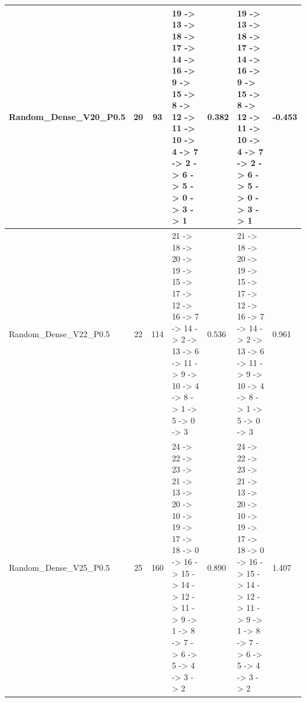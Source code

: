 \documentclass[8pt]{article}
\begin{document}
\begin{longtable}{@{}L{3.2cm} c c L{4cm} L{1.2cm} L{4cm} L{1.2cm}@{}}
\midrule
Random\_Dense\_V20\_P0.5 & 20 & 93 & 19 -\textgreater{} 13 -\textgreater{} 18 -\textgreater{} 17 -\textgreater{} 14 -\textgreater{} 16 -\textgreater{} 9 -\textgreater{} 15 -\textgreater{} 8 -\textgreater{} 12 -\textgreater{} 11 -\textgreater{} 10 -\textgreater{} 4 -\textgreater{} 7 -\textgreater{} 2 -\textgreater{} 6 -\textgreater{} 5 -\textgreater{} 0 -\textgreater{} 3 -\textgreater{} 1 & 0.382 & 19 -\textgreater{} 13 -\textgreater{} 18 -\textgreater{} 17 -\textgreater{} 14 -\textgreater{} 16 -\textgreater{} 9 -\textgreater{} 15 -\textgreater{} 8 -\textgreater{} 12 -\textgreater{} 11 -\textgreater{} 10 -\textgreater{} 4 -\textgreater{} 7 -\textgreater{} 2 -\textgreater{} 6 -\textgreater{} 5 -\textgreater{} 0 -\textgreater{} 3 -\textgreater{} 1 & -0.453 \\
\midrule
Random\_Dense\_V22\_P0.5 & 22 & 114 & 21 -\textgreater{} 18 -\textgreater{} 20 -\textgreater{} 19 -\textgreater{} 15 -\textgreater{} 17 -\textgreater{} 12 -\textgreater{} 16 -\textgreater{} 7 -\textgreater{} 14 -\textgreater{} 2 -\textgreater{} 13 -\textgreater{} 6 -\textgreater{} 11 -\textgreater{} 9 -\textgreater{} 10 -\textgreater{} 4 -\textgreater{} 8 -\textgreater{} 1 -\textgreater{} 5 -\textgreater{} 0 -\textgreater{} 3 & 0.536 & 21 -\textgreater{} 18 -\textgreater{} 20 -\textgreater{} 19 -\textgreater{} 15 -\textgreater{} 17 -\textgreater{} 12 -\textgreater{} 16 -\textgreater{} 7 -\textgreater{} 14 -\textgreater{} 2 -\textgreater{} 13 -\textgreater{} 6 -\textgreater{} 11 -\textgreater{} 9 -\textgreater{} 10 -\textgreater{} 4 -\textgreater{} 8 -\textgreater{} 1 -\textgreater{} 5 -\textgreater{} 0 -\textgreater{} 3 & 0.961 \\
\midrule
Random\_Dense\_V25\_P0.5 & 25 & 160 & 24 -\textgreater{} 22 -\textgreater{} 23 -\textgreater{} 21 -\textgreater{} 13 -\textgreater{} 20 -\textgreater{} 10 -\textgreater{} 19 -\textgreater{} 17 -\textgreater{} 18 -\textgreater{} 0 -\textgreater{} 16 -\textgreater{} 15 -\textgreater{} 14 -\textgreater{} 12 -\textgreater{} 11 -\textgreater{} 9 -\textgreater{} 1 -\textgreater{} 8 -\textgreater{} 7 -\textgreater{} 6 -\textgreater{} 5 -\textgreater{} 4 -\textgreater{} 3 -\textgreater{} 2 & 0.890 & 24 -\textgreater{} 22 -\textgreater{} 23 -\textgreater{} 21 -\textgreater{} 13 -\textgreater{} 20 -\textgreater{} 10 -\textgreater{} 19 -\textgreater{} 17 -\textgreater{} 18 -\textgreater{} 0 -\textgreater{} 16 -\textgreater{} 15 -\textgreater{} 14 -\textgreater{} 12 -\textgreater{} 11 -\textgreater{} 9 -\textgreater{} 1 -\textgreater{} 8 -\textgreater{} 7 -\textgreater{} 6 -\textgreater{} 5 -\textgreater{} 4 -\textgreater{} 3 -\textgreater{} 2 & 1.407 \\
\midrule
\end{longtable}
\end{document}
